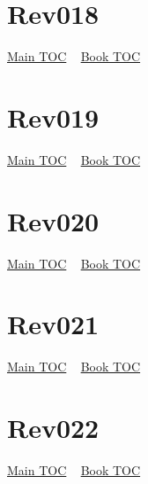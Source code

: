 \documentclass{book}
\begin{document}
  \section{Rev018}\hyperlink{toc}{Main TOC} ~ \hyperref[subsec:Rev]{Book TOC} 
  \section{Rev019}\hyperlink{toc}{Main TOC} ~ \hyperref[subsec:Rev]{Book TOC} 
  \section{Rev020}\hyperlink{toc}{Main TOC} ~ \hyperref[subsec:Rev]{Book TOC} 
  \section{Rev021}\hyperlink{toc}{Main TOC} ~ \hyperref[subsec:Rev]{Book TOC} 
  \section{Rev022}\hyperlink{toc}{Main TOC} ~ \hyperref[subsec:Rev]{Book TOC} 
\end{document}
